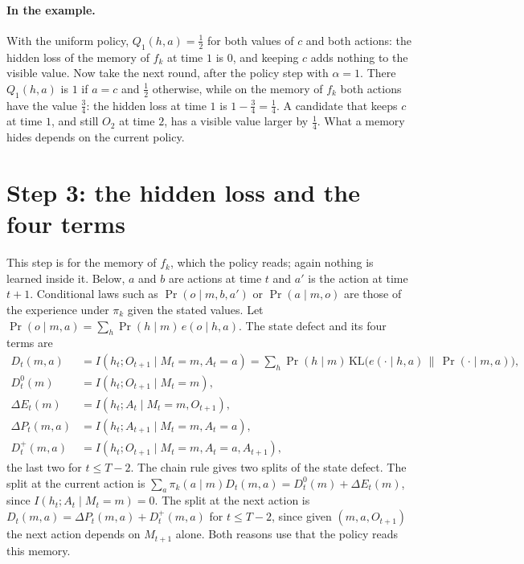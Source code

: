 \documentclass[11pt]{article}
\theoremstyle{definition}
\newcommand{\KL}{\mathrm{KL}}
\newcommand{\dE}{\Delta E}
\newcommand{\dP}{\Delta P}
\begin{document}
\paragraph{In the example.} With the uniform policy, $Q_1(h,a)=\tfrac12$ for both values of $c$ and both actions: the hidden loss of the memory of $f_k$ at time $1$ is $0$, and keeping $c$ adds nothing to the visible value. Now take the next round, after the policy step with $\alpha=1$. There $Q_1(h,a)$ is $1$ if $a=c$ and $\tfrac12$ otherwise, while on the memory of $f_k$ both actions have the value $\tfrac34$: the hidden loss at time $1$ is $1-\tfrac34=\tfrac14$. A candidate that keeps $c$ at time $1$, and still $O_2$ at time $2$, has a visible value larger by $\tfrac14$. What a memory hides depends on the current policy.

\section{Step 3: the hidden loss and the four terms}

This step is for the memory of $f_k$, which the policy reads; again nothing is learned inside it. Below, $a$ and $b$ are actions at time $t$ and $a'$ is the action at time $t+1$. Conditional laws such as $\Pr(o\mid m,b,a')$ or $\Pr(a\mid m,o)$ are those of the experience under $\pi_k$ given the stated values. Let $\Pr(o\mid m,a)=\sum_h\Pr(h\mid m)\,e(o\mid h,a)$. The state defect and its four terms are
\begin{align*}
D_t(m,a)&=I(h_t;O_{t+1}\mid M_t=m,A_t=a)=\sum_h\Pr(h\mid m)\,\KL\big(e(\cdot\mid h,a)\,\big\|\,\Pr(\cdot\mid m,a)\big),\\
D^0_t(m)&=I(h_t;O_{t+1}\mid M_t=m),\\
\dE_t(m)&=I(h_t;A_t\mid M_t=m,O_{t+1}),\\
\dP_t(m,a)&=I(h_t;A_{t+1}\mid M_t=m,A_t=a),\\
D^+_t(m,a)&=I(h_t;O_{t+1}\mid M_t=m,A_t=a,A_{t+1}),
\end{align*}
the last two for $t\le T-2$. The chain rule gives two splits of the state defect. The split at the current action is $\sum_a\pi_k(a\mid m)D_t(m,a)=D^0_t(m)+\dE_t(m)$, since $I(h_t;A_t\mid M_t=m)=0$. The split at the next action is $D_t(m,a)=\dP_t(m,a)+D^+_t(m,a)$ for $t\le T-2$, since given $(m,a,O_{t+1})$ the next action depends on $M_{t+1}$ alone. Both reasons use that the policy reads this memory.
\end{document}
